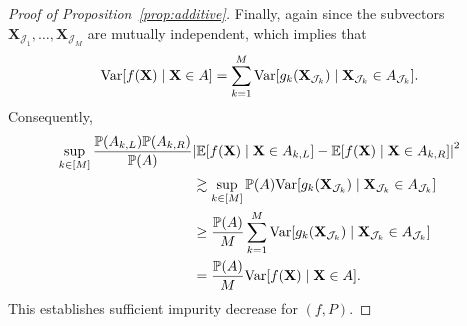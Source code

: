 \documentclass[11pt]{article}
\theoremstyle{plain}
\theoremstyle{definition}
\theoremstyle{remark}
\theoremstyle{plain}
\newcommand{\bX}{\mathbf{X}}
\DeclarePairedDelimiter{\bracks}{[}{]}
\DeclarePairedDelimiter{\abs}{|}{|}
\renewcommand{\P}{\mathbb{P}}
\newcommand{\E}{\mathbb{E}}
\newcommand{\Var}{\textnormal{Var}}
\newcommand{\1}{\mathbbm{1}}
\begin{document}
\begin{proof}[Proof of Proposition~\ref{prop:additive}]
    Finally, again since the subvectors $\bX_{\mathcal{J}_1}, \dots, \bX_{\mathcal{J}_M}$ are mutually independent, which implies that
    \begin{equation*}
        \Var\bracks*{f(\bX) \mid \bX \in A} = \sum_{k=1}^M \Var\bracks*{g_k(\bX_{\mathcal{J}_k}) \mid \bX_{\mathcal{J}_k} \in A_{\mathcal{J}_k}}.
    \end{equation*}
    Consequently,
    \begin{equation*}
        \begin{aligned}
            \sup_{k \in [M]} \frac{\P(A_{k,L})\P(A_{k,R})}{\P(A)} &\abs*{ \E\bracks*{f(\bX) \mid \bX \in A_{k,L}} - \E\bracks*{f(\bX) \mid \bX \in A_{k,R}} }^2 \\
            &\gtrsim \sup_{k \in [M]} \P(A) \Var\bracks*{g_k(\bX_{\mathcal{J}_k}) \mid \bX_{\mathcal{J}_k} \in A_{\mathcal{J}_k}} \\
            &\geq \frac{\P(A)}{M} \sum_{k=1}^M \Var\bracks*{g_k(\bX_{\mathcal{J}_k}) \mid \bX_{\mathcal{J}_k} \in A_{\mathcal{J}_k}} \\
            &= \frac{\P(A)}{M} \Var\bracks*{f(\bX) \mid \bX \in A}.
        \end{aligned}
    \end{equation*}
    This establishes sufficient impurity decrease for $(f, P)$.


\end{proof}
\end{document}
